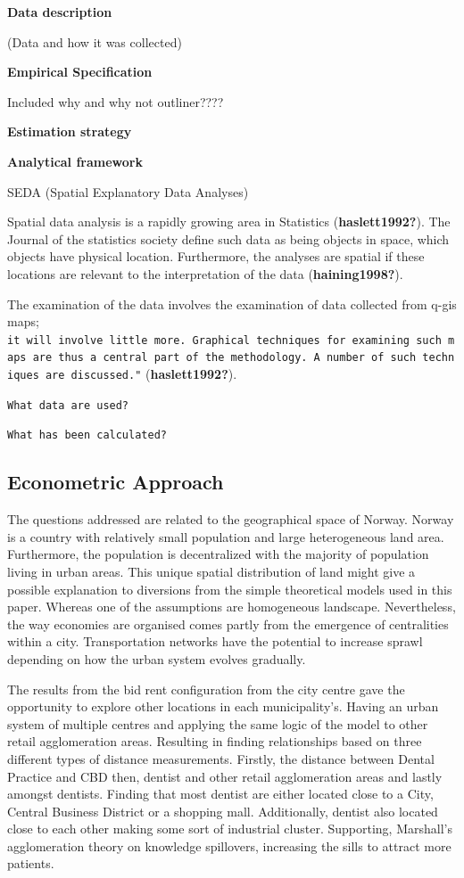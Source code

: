 \documentclass[
  10,
  a4paper,
]{article}
\begin{document}
\textbf{Data description}

(Data and how it was collected)

\textbf{Empirical Specification}

Included why and why not outliner????

\textbf{Estimation strategy}

\textbf{Analytical framework}

SEDA (Spatial Explanatory Data Analyses)

Spatial data analysis is a rapidly growing area in Statistics
(\textbf{haslett1992?}). The Journal of the statistics society define
such data as being objects in space, which objects have physical
location. Furthermore, the analyses are spatial if these locations are
relevant to the interpretation of the data (\textbf{haining1998?}).

The examination of the data involves the examination of data collected
from q-gis maps;
\texttt{it\ will\ involve\ little\ more.\ Graphical\ techniques\ for\ examining\ such\ maps\ are\ thus\ a\ central\ part\ of\ the\ methodology.\ A\ number\ of\ such\ techniques\ are\ discussed."}
(\textbf{haslett1992?}).

\texttt{What\ data\ are\ used?}

\texttt{What\ has\ been\ calculated?}

\hypertarget{econometric-approach}{%
\subsection{\texorpdfstring{\textbf{Econometric
Approach}}{Econometric Approach}}\label{econometric-approach}}

The questions addressed are related to the geographical space of Norway.
Norway is a country with relatively small population and large
heterogeneous land area. Furthermore, the population is decentralized
with the majority of population living in urban areas. This unique
spatial distribution of land might give a possible explanation to
diversions from the simple theoretical models used in this paper.
Whereas one of the assumptions are homogeneous landscape. Nevertheless,
the way economies are organised comes partly from the emergence of
centralities within a city. Transportation networks have the potential
to increase sprawl depending on how the urban system evolves gradually.

The results from the bid rent configuration from the city centre gave
the opportunity to explore other locations in each municipality's.
Having an urban system of multiple centres and applying the same logic
of the model to other retail agglomeration areas. Resulting in finding
relationships based on three different types of distance measurements.
Firstly, the distance between Dental Practice and CBD then, dentist and
other retail agglomeration areas and lastly amongst dentists. Finding
that most dentist are either located close to a City, Central Business
District or a shopping mall. Additionally, dentist also located close to
each other making some sort of industrial cluster. Supporting,
Marshall's agglomeration theory on knowledge spillovers, increasing the
sills to attract more patients.
\end{document}
